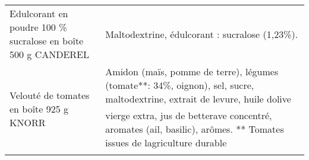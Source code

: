 \begin{longtable}{p{5cm}p{10cm}}
                                             Edulcorant en poudre 100 \% sucralose en boîte 500 g CANDEREL &                                                                                                                                                                                                                                                                                                                                                                                                                                                                                                                                                                                                                                                                                                                                                                                                                                                                                                                                                                                           Maltodextrine, édulcorant : sucralose (1,23\%). \\
                                                                  Velouté de tomates en boîte 925 g KNORR &                                                                                                                                                                                                                                                                                                                                                                                                                                                                                                                                                                                                                                                                                                                                                                                       Amidon (maïs, pomme de terre), légumes (tomate**: 34\%, oignon), sel, sucre, maltodextrine, extrait de levure, huile dolive vierge extra, jus de betterave concentré, aromates (ail, basilic), arômes.  ** Tomates issues de lagriculture durable \\

\end{longtable}
